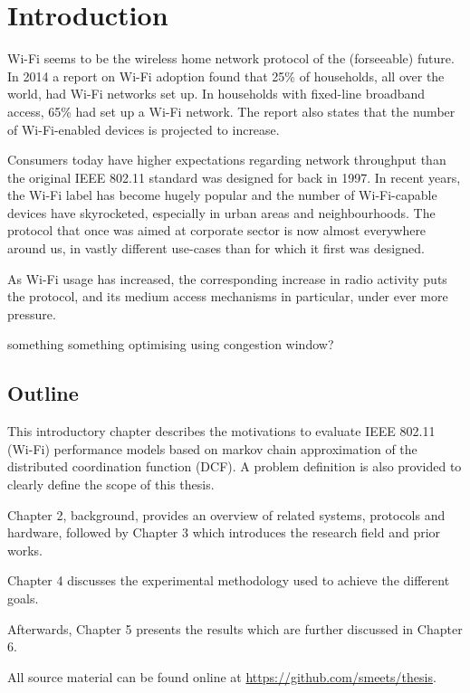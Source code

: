 
\chapter{Introduction}

Wi-Fi seems to be the wireless home network protocol of the (forseeable)
future. In 2014 a report on Wi-Fi adoption found that 25\% of households, all
over the world, had Wi-Fi networks set up. In households with fixed-line
broadband access, 65\% had set up a Wi-Fi network\cite{smith}. The report also
states that the number of Wi-Fi-enabled devices is projected to increase.

Consumers today have higher expectations regarding network throughput than the
original IEEE 802.11 standard was designed for back in 1997. In recent years,
the Wi-Fi label has become hugely popular and the number of Wi-Fi-capable
devices have skyrocketed, especially in urban areas and neighbourhoods. The
protocol that once was aimed at corporate sector is now almost everywhere
around us, in vastly different use-cases than for which it first was designed.

As Wi-Fi usage has increased, the corresponding increase in radio activity
puts the protocol, and its medium access mechanisms in particular, under ever
more pressure. 

something something optimising using congestion window?

\section{Outline} 

This introductory chapter describes the motivations to evaluate IEEE 802.11
(Wi-Fi) performance models based on markov chain approximation of the
distributed coordination function (DCF). A problem definition is also provided
to clearly define the scope of this thesis.

Chapter 2, background, provides an overview of related systems, protocols and
hardware, followed by Chapter 3 which introduces the research field and prior
works.

Chapter 4 discusses the experimental methodology used to achieve the different
goals.	

Afterwards, Chapter 5 presents the results which are further discussed in
Chapter 6.

All source material can be found online at \url{https://github.com/smeets/thesis}.

